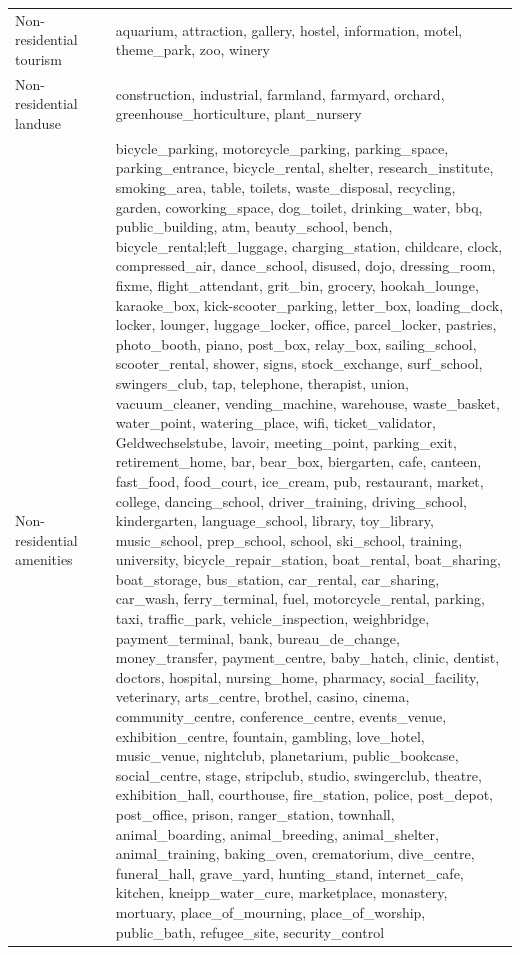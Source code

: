 \begin{scriptsize}
\begin{longtable}{p{0.20\linewidth} p{0.8\linewidth}}
    \addlinespace
      Non-residential tourism &
        aquarium, attraction, gallery, hostel, information, motel, theme\_park, zoo, winery 
    \\
      \addlinespace
      Non-residential landuse &
        construction, industrial, farmland, farmyard, orchard, greenhouse\_horticulture, plant\_nursery \\
      \addlinespace
      Non-residential amenities &
        bicycle\_parking, motorcycle\_parking, parking\_space, parking\_entrance, bicycle\_rental, shelter, research\_institute, smoking\_area, table, toilets, waste\_disposal, recycling, garden, coworking\_space, dog\_toilet, drinking\_water, bbq, public\_building, atm, beauty\_school, bench, bicycle\_rental;left\_luggage, charging\_station, childcare, clock, compressed\_air, dance\_school, disused, dojo, dressing\_room, fixme, flight\_attendant, grit\_bin, grocery, hookah\_lounge, karaoke\_box, kick-scooter\_parking, letter\_box, loading\_dock, locker, lounger, luggage\_locker, office, parcel\_locker, pastries, photo\_booth, piano, post\_box, relay\_box, sailing\_school, scooter\_rental, shower, signs, stock\_exchange, surf\_school, swingers\_club, tap, telephone, therapist, union, vacuum\_cleaner, vending\_machine, warehouse, waste\_basket, water\_point, watering\_place, wifi, ticket\_validator, Geldwechselstube, lavoir, meeting\_point, parking\_exit, retirement\_home, bar, bear\_box, biergarten, cafe, canteen, fast\_food, food\_court, ice\_cream, pub, restaurant, market, college, dancing\_school, driver\_training, driving\_school, kindergarten, language\_school, library, toy\_library, music\_school, prep\_school, school, ski\_school, training, university, bicycle\_repair\_station, boat\_rental, boat\_sharing, boat\_storage, bus\_station, car\_rental, car\_sharing, car\_wash, ferry\_terminal, fuel, motorcycle\_rental, parking, taxi, traffic\_park, vehicle\_inspection, weighbridge, payment\_terminal, bank, bureau\_de\_change, money\_transfer, payment\_centre, baby\_hatch, clinic, dentist, doctors, hospital, nursing\_home, pharmacy, social\_facility, veterinary, arts\_centre, brothel, casino, cinema, community\_centre, conference\_centre, events\_venue, exhibition\_centre, fountain, gambling, love\_hotel, music\_venue, nightclub, planetarium, public\_bookcase, social\_centre, stage, stripclub, studio, swingerclub, theatre, exhibition\_hall, courthouse, fire\_station, police, post\_depot, post\_office, prison, ranger\_station, townhall, animal\_boarding, animal\_breeding, animal\_shelter, animal\_training, baking\_oven, crematorium, dive\_centre, funeral\_hall, grave\_yard, hunting\_stand, internet\_cafe, kitchen, kneipp\_water\_cure, marketplace, monastery, mortuary, place\_of\_mourning, place\_of\_worship, public\_bath, refugee\_site, security\_control
    \\
    \end{longtable}
    \end{scriptsize}


